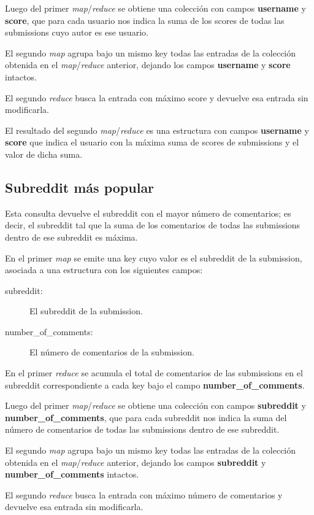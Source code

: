 \documentclass[a4paper,10pt,twoside]{article}
\newcommand{\map}{\emph{map}\xspace}
\newcommand{\reduce}{\emph{reduce}\xspace}
\begin{document}
Luego del primer \map/\reduce se obtiene una colección con campos \textbf{username} y \textbf{score}, que para cada usuario nos indica la suma de los scores de todas las submissions cuyo autor es ese usuario.

El segundo \map agrupa bajo un mismo key todas las entradas de la colección obtenida en el \map/\reduce anterior, dejando los campos \textbf{username} y \textbf{score} intactos.

El segundo \reduce busca la entrada con máximo score y devuelve esa entrada sin modificarla.

El resultado del segundo \map/\reduce es una estructura con campos \textbf{username} y \textbf{score} que indica el usuario con la máxima suma de scores de submissions y el valor de dicha suma.


\subsection{Subreddit más popular}

Esta consulta devuelve el subreddit con el mayor número de comentarios; es decir, el subreddit tal que la suma de los comentarios de todas las submissions dentro de ese subreddit es máxima.

En el primer \map se emite una key cuyo valor es el subreddit de la submission, asociada a una estructura con los siguientes campos:

\begin{description}
	\item[subreddit:] El subreddit de la submission.
	\item[number\_of\_comments:] El número de comentarios de la submission.
\end{description}

En el primer \reduce se acumula el total de comentarios de las submissions en el subreddit correspondiente a cada key bajo el campo \textbf{number\_of\_comments}.

Luego del primer \map/\reduce se obtiene una colección con campos \textbf{subreddit} y \textbf{number\_of\_comments}, que para cada subreddit nos indica la suma del número de comentarios de todas las submissions dentro de ese subreddit.

El segundo \map agrupa bajo un mismo key todas las entradas de la colección obtenida en el \map/\reduce anterior, dejando los campos \textbf{subreddit} y \textbf{number\_of\_comments} intactos.

El segundo \reduce busca la entrada con máximo número de comentarios y devuelve esa entrada sin modificarla.
\end{document}
